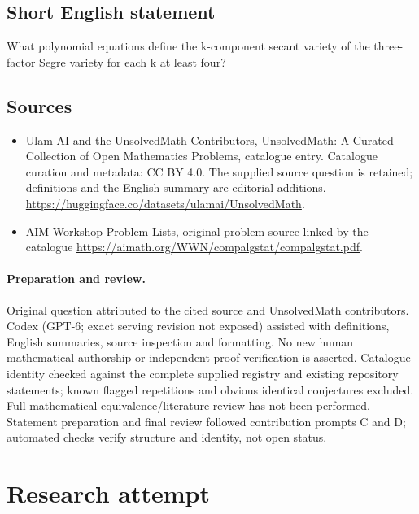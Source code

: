 \documentclass[11pt]{article}
\begin{document}
\subsection{Short English statement}
What polynomial equations define the k-component secant variety of the three-factor Segre variety for each k at least four?
\subsection{Sources}
\begin{itemize}
\item[S1] Ulam AI and the UnsolvedMath Contributors, UnsolvedMath: A Curated Collection of Open Mathematics Problems, catalogue entry. Catalogue curation and metadata: CC BY 4.0. The supplied source question is retained; definitions and the English summary are editorial additions.
\url{https://huggingface.co/datasets/ulamai/UnsolvedMath}.
\item[S2] AIM Workshop Problem Lists, original problem source linked by the catalogue
\url{https://aimath.org/WWN/compalgstat/compalgstat.pdf}.
\end{itemize}
\paragraph{Preparation and review.}
Original question attributed to the cited source and UnsolvedMath contributors. Codex (GPT-6; exact serving revision not exposed) assisted with definitions, English summaries, source inspection and formatting. No new human mathematical authorship or independent proof verification is asserted. Catalogue identity checked against the complete supplied registry and existing repository statements; known flagged repetitions and obvious identical conjectures excluded. Full mathematical-equivalence/literature review has not been performed. Statement preparation and final review followed contribution prompts C and D; automated checks verify structure and identity, not open status.
\label{end:statement}


\section{Research attempt}
\end{document}
